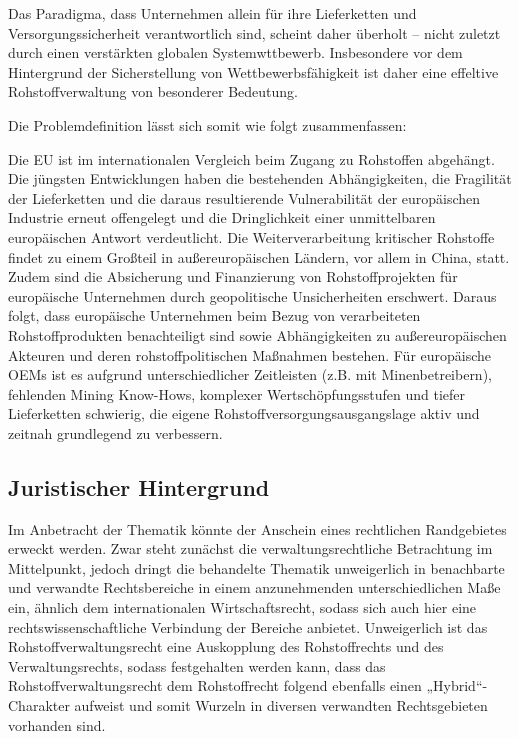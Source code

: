\documentclass[12pt,a4paper,oneside]{book} %
\begin{document}
Das Paradigma, dass Unternehmen allein für ihre Lieferketten und Versorgungssicherheit verantwortlich sind, scheint daher überholt -- nicht zuletzt durch einen verstärkten globalen Systemwttbewerb. Insbesondere vor dem Hintergrund der Sicherstellung von Wettbewerbsfähigkeit ist daher eine effeltive Rohstoffverwaltung von besonderer Bedeutung.

Die Problemdefinition lässt sich somit wie folgt zusammenfassen:

Die EU ist im internationalen Vergleich beim Zugang zu Rohstoffen abgehängt. Die jüngsten Entwicklungen haben die bestehenden Abhängigkeiten, die Fragilität der Lieferketten und die daraus resultierende Vulnerabilität der europäischen Industrie erneut offengelegt und die Dringlichkeit einer unmittelbaren europäischen Antwort verdeutlicht.  Die Weiterverarbeitung kritischer Rohstoffe findet zu einem Großteil in außereuropäischen Ländern, vor allem in China, statt. Zudem sind die Absicherung und Finanzierung von Rohstoffprojekten für europäische Unternehmen durch geopolitische Unsicherheiten erschwert. Daraus folgt, dass europäische Unternehmen beim Bezug von verarbeiteten Rohstoffprodukten benachteiligt sind sowie Abhängigkeiten zu außereuropäischen Akteuren und deren rohstoffpolitischen Maßnahmen bestehen.  Für europäische OEMs ist es aufgrund unterschiedlicher Zeitleisten (z.B. mit Minenbetreibern), fehlenden Mining Know-Hows, komplexer Wertschöpfungsstufen und tiefer Lieferketten schwierig, die eigene Rohstoffversorgungsausgangslage aktiv und zeitnah grundlegend zu verbessern.  


	
	\subsection{Juristischer Hintergrund}
	Im Anbetracht der Thematik könnte der Anschein eines rechtlichen Randgebietes erweckt werden. Zwar steht zunächst die verwaltungsrechtliche Betrachtung im Mittelpunkt, jedoch dringt die behandelte Thematik unweigerlich in benachbarte und verwandte Rechtsbereiche in einem anzunehmenden unterschiedlichen Maße ein, ähnlich dem internationalen Wirtschaftsrecht, sodass sich auch hier eine rechtswissenschaftliche Verbindung der Bereiche anbietet. \autocite[1, 2]{herdegen_internationales_2020} Unweigerlich ist das Rohstoffverwaltungsrecht eine Auskopplung des Rohstoffrechts und des Verwaltungsrechts, sodass festgehalten werden kann, dass das Rohstoffverwaltungsrecht dem Rohstoffrecht folgend ebenfalls einen „Hybrid“-Charakter aufweist und somit Wurzeln in diversen verwandten Rechtsgebieten vorhanden sind. \autocite[358]{terhechte_konsolidierung_2015}
	
\end{document}
